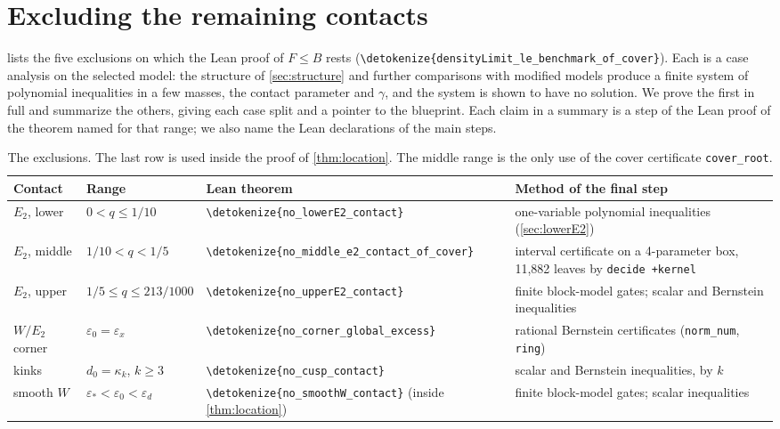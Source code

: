 \documentclass[10pt]{article}
\theoremstyle{definition}
\theoremstyle{remark}
\numberwithin{equation}{section}
\newcommand{\eps}{\varepsilon}
\newcommand{\lean}[1]{\texttt{#1}}
\newcommand{\leanid}[1]{\expandafter\nolinkurl\expandafter{\detokenize{#1}}}
\begin{document}
\section{Excluding the remaining contacts}\label{sec:exclusions}

 lists the five exclusions on which the Lean proof of $F\le B$ rests (\leanid{densityLimit_le_benchmark_of_cover}). Each is a case analysis on the selected model: the structure of \cref{sec:structure} and further comparisons with modified models produce a finite system of polynomial inequalities in a few masses, the contact parameter and $\gamma$, and the system is shown to have no solution. We prove the first in full and summarize the others, giving each case split and a pointer to the blueprint. Each claim in a summary is a step of the Lean proof of the theorem named for that range; we also name the Lean declarations of the main steps.

\begin{table}[t]
\centering\small
\begin{tabularx}{\linewidth}{@{}>{\raggedright\arraybackslash}p{2.0cm}>{\raggedright\arraybackslash}p{2.9cm}>{\raggedright\arraybackslash}p{4.0cm}>{\raggedright\arraybackslash}X@{}}
\toprule
Contact & Range & Lean theorem & Method of the final step\\
\midrule
$E_2$, lower & $0<q\le1/10$ & \leanid{no_lowerE2_contact} & one-variable polynomial inequalities (\cref{sec:lowerE2})\\
$E_2$, middle & $1/10<q<1/5$ & \leanid{no_middle_e2_contact_of_cover} & interval certificate on a 4-parameter box, 11,882 leaves by \lean{decide +kernel}\\
$E_2$, upper & $1/5\le q\le213/1000$ & \leanid{no_upperE2_contact} & finite block-model gates; scalar and Bernstein inequalities\\
$W/E_2$ corner & $\eps_0=\eps_x$ & \leanid{no_corner_global_excess} & rational Bernstein certificates (\lean{norm\_num}, \lean{ring})\\
kinks & $d_0=\kappa_k$, $k\ge3$ & \leanid{no_cusp_contact} & scalar and Bernstein inequalities, by $k$\\
\midrule
smooth $W$ & $\eps_*<\eps_0<\eps_d$ & \leanid{no_smoothW_contact} (inside \cref{thm:location}) & finite block-model gates; scalar inequalities\\
\bottomrule
\end{tabularx}
\caption{The exclusions. The last row is used inside the proof of \cref{thm:location}. The middle range is the only use of the cover certificate \lean{cover\_root}.}
\label{tab:contacts}
\end{table}
\end{document}
